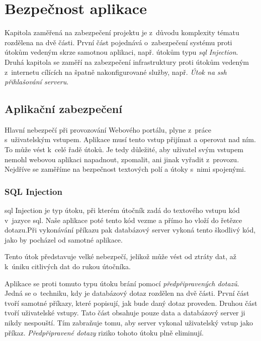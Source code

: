 \section{Bezpečnost aplikace}
\label{sec:security}

Kapitola zaměřená na zabezpečení projektu \bso je z~důvodu komplexity tématu rozdělena na dvě části.  První část pojednává o~zabezpečení systému proti útokům vedeným skrze samotnou aplikaci, např. útokům typu \emph{\acrshort{sql} Injection}. Druhá kapitola se zaměří na zabezpečení infrastruktury proti útokům vedeným z~internetu cílících na špatně nakonfigurované služby, např. \emph{Útok na \acrshort{ssh} přihlašování serveru}.

\subsection{Aplikační zabezpečení}

Hlavní nebezpečí při provozování Webového portálu, plyne z~práce s~uživatelským vstupem. Aplikace musí tento vstup přijímat a operovat nad ním. To může vést k~celé řadě útoků. Je tedy důležité, aby uživatel svým vstupem nemohl webovou aplikaci napadnout, zpomalit, ani jinak vyřadit z~provozu. Nejdříve se zaměříme na bezpečnost textových polí a útoky s~nimi spojenými.

\subsubsection{SQL Injection}

\acrshort{sql} Injection\cite{sqlinject} je typ útoku, při kterém útočník zadá do textového vstupu kód v~jazyce \acrshort{sql}. Naše aplikace poté tento kód vezme a přímo ho vloží do řetězce dotazu.Při vykonávání příkazu pak databázový server vykoná tento škodlivý kód, jako by pocházel od samotné aplikace.

Tento útok představuje velké nebezpečí, jelikož může vést od ztráty dat, až k~úniku citlivých dat do rukou útočníka.

Aplikace \bso se proti tomuto typu útoku brání pomocí \emph{předpřipravených dotazů}\cite{mysqlprepstmt}. Jedná se o~techniku, kdy je databázový dotaz rozdělen na dvě části. První část tvoří samotné příkazy, které popisují, jak bude daný dotaz proveden. Druhou část tvoří uživatelské vstupy. Tato část obsahuje pouze data a databázový server ji nikdy nespouští. Tím zabraňuje tomu, aby server vykonal uživatelský vstup jako příkaz. \emph{Předpřipravené dotazy}\cite{mysqlprepstmt} riziko tohoto útoku plně eliminují.

